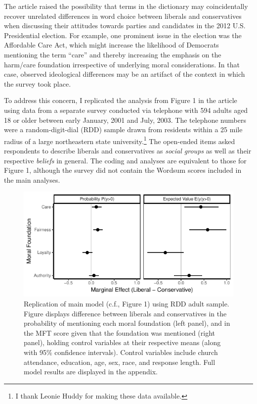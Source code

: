 \documentclass[12pt]{article}
\begin{document}
The article raised the possibility that terms in the dictionary may coincidentally recover unrelated differences in word choice between liberals and conservatives when discussing their attitudes towards parties and candidates in the 2012 U.S. Presidential election. For example, one prominent issue in the election was the Affordable Care Act, which might increase the likelihood of Democrats mentioning the term ``care'' and thereby increasing the emphasis on the harm/care foundation irrespective of underlying moral considerations. In that case, observed ideological differences may be an artifact of the context in which the survey took place.

To address this concern, I replicated the analysis from Figure 1 in the article using data from a separate survey conducted via telephone with 594 adults aged 18 or older between early January, 2001 and July, 2003. The telephone numbers were a random-digit-dial (RDD) sample drawn from residents within a 25 mile radius of a large northeastern state university.\footnote{I thank Leonie Huddy for making these data available.} The open-ended items asked respondents to describe liberals and conservatives as \textit{social groups} as well as their respective \textit{beliefs} in general. The coding and analyses are equivalent to those for Figure 1, although the survey did not contain the Wordsum scores included in the main analyses.

\begin{figure}[ht]\centering
\includegraphics{../calc/fig/tobit_ideol_lisurvey.pdf}
\caption{Replication of main model (c.f., Figure 1) using RDD adult sample. Figure displays difference between liberals and conservatives in the probability of mentioning each moral foundation (left panel), and in the MFT score given that the foundation was mentioned (right panel), holding control variables at their respective means (along with 95\% confidence intervals). Control variables include church attendance, education, age, sex, race, and response length. Full model results are displayed in the appendix.
}\label{fig:tobit_ideol_lisurvey}
\end{figure}
\end{document}
